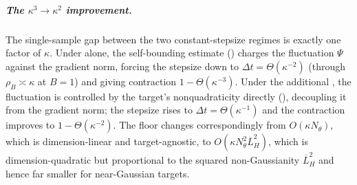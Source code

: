 \documentclass[11pt]{article}
\theoremstyle{plain}
\theoremstyle{definition}
\theoremstyle{remark}
\newcommand{\barLH}{\overline{L}_H}
\begin{document}
\subparagraph{The $\kappa^3\to\kappa^2$ improvement.}
The single-sample gap between the two constant-stepsize regimes is exactly one factor of $\kappa$.
Under  alone, the self-bounding estimate
() charges the fluctuation $\Psi$ against the gradient norm, forcing the
stepsize down to $\Delta t=\Theta(\kappa^{-2})$ (through $\rho_B\asymp\kappa$ at $B=1$) and giving
contraction $1-\Theta(\kappa^{-3})$. Under the additional , the
fluctuation is controlled by the target's nonquadraticity directly (), decoupling
it from the gradient norm; the stepsize rises to $\Delta t=\Theta(\kappa^{-1})$ and the contraction
improves to $1-\Theta(\kappa^{-2})$. The floor changes correspondingly from $O(\kappa N_\theta)$,
which is dimension-linear and target-agnostic, to $O(\kappa N_\theta^2\barLH^2)$, which is
dimension-quadratic but proportional to the squared non-Gaussianity $\barLH^2$ and hence far
smaller for near-Gaussian targets.
\end{document}
